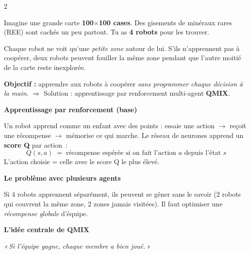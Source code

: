 \documentclass[a4paper,landscape]{article}
\begin{document}
\begin{multicols}{2}

\begin{tcolorbox}[colback=colROS!6,colframe=colROS,
    fonttitle=\bfseries\normalsize,title=Partie 0 — Le problème à résoudre,
    arc=5pt,boxrule=1.3pt]
Imagine une grande carte \textbf{100\(\times\)100 cases}.
Des gisements de minéraux rares (REE) sont cachés un peu partout.
Tu as \textbf{4 robots} pour les trouver.

Chaque robot ne voit qu'une \textit{petite zone} autour de lui.
S'ils n'apprennent pas à coopérer, deux robots peuvent fouiller la même
zone pendant que l'autre moitié de la carte reste inexplorée.

\medskip
\textbf{Objectif :} apprendre aux robots à coopérer
\textit{sans programmer chaque décision à la main.}
\(\Rightarrow\) Solution : apprentissage par renforcement multi-agent \textbf{QMIX}.
\end{tcolorbox}

\vspace{0.35cm}

\begin{tcolorbox}[colback=colServer!6,colframe=colServer,
    fonttitle=\bfseries\normalsize,title=Partie 1 — QMIX expliqué simplement,
    arc=5pt,boxrule=1.3pt]

\textbf{Apprentissage par renforcement (base)}

Un robot apprend comme un enfant avec des points :
essaie une action \(\to\) reçoit une récompense \(\to\) mémorise ce qui marche.
Le réseau de neurones apprend un \textbf{score Q} par action~:
\[
    Q(s,a) \;=\; \text{récompense espérée si on fait l'action } a \text{ depuis l'état } s
\]
L'action choisie = celle avec le score Q le plus élevé.

\medskip
\textbf{Le problème avec plusieurs agents}

Si 4 robots apprennent séparément, ils peuvent se gêner sans le savoir
(2 robots qui couvrent la même zone, 2 zones jamais visitées).
Il faut optimiser une \textit{récompense globale} d'équipe.

\medskip
\textbf{L'idée centrale de QMIX}

\begin{center}
\textit{«\,Si l'équipe gagne, chaque membre a bien joué.\,»}
\end{center}


\end{tcolorbox}
\end{multicols}
\end{document}
